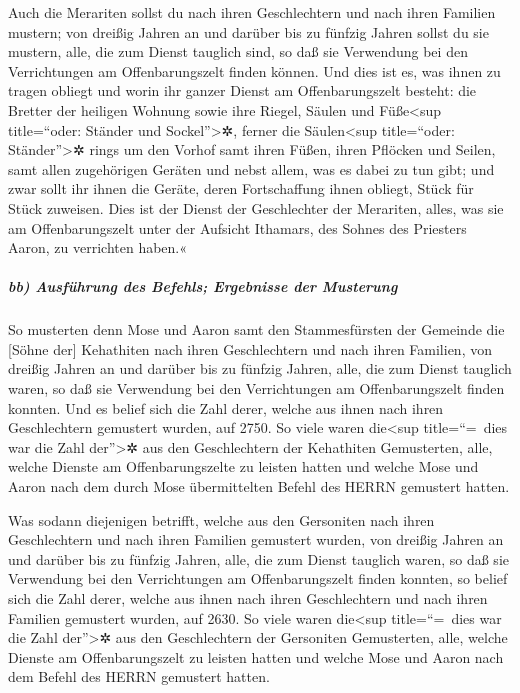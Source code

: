 Auch die Merariten sollst du nach ihren Geschlechtern und
nach ihren Familien mustern; von dreißig Jahren an und
darüber bis zu fünfzig Jahren sollst du sie mustern, alle, die zum
Dienst tauglich sind, so daß sie Verwendung bei den Verrichtungen am
Offenbarungszelt finden können. Und dies ist es, was
ihnen zu tragen obliegt und worin ihr ganzer Dienst am Offenbarungszelt
besteht: die Bretter der heiligen Wohnung sowie ihre Riegel, Säulen und
Füße\textless sup title=``oder: Ständer und Sockel''\textgreater✲,
ferner die Säulen\textless sup title=``oder:
Ständer''\textgreater✲ rings um den Vorhof samt ihren Füßen, ihren
Pflöcken und Seilen, samt allen zugehörigen Geräten und nebst allem, was
es dabei zu tun gibt; und zwar sollt ihr ihnen die Geräte, deren
Fortschaffung ihnen obliegt, Stück für Stück zuweisen.
Dies ist der Dienst der Geschlechter der Merariten,
alles, was sie am Offenbarungszelt unter der Aufsicht Ithamars, des
Sohnes des Priesters Aaron, zu verrichten haben.«

\hypertarget{bb-ausfuxfchrung-des-befehls-ergebnisse-der-musterung}{%
\subparagraph{bb) Ausführung des Befehls; Ergebnisse der
Musterung}\label{bb-ausfuxfchrung-des-befehls-ergebnisse-der-musterung}}

So musterten denn Mose und Aaron samt den Stammesfürsten
der Gemeinde die {[}Söhne der{]} Kehathiten nach ihren Geschlechtern und
nach ihren Familien, von dreißig Jahren an und darüber
bis zu fünfzig Jahren, alle, die zum Dienst tauglich waren, so daß sie
Verwendung bei den Verrichtungen am Offenbarungszelt finden konnten.
Und es belief sich die Zahl derer, welche aus ihnen nach
ihren Geschlechtern gemustert wurden, auf 2750. So viele
waren die\textless sup title=``=~dies war die Zahl der''\textgreater✲
aus den Geschlechtern der Kehathiten Gemusterten, alle, welche Dienste
am Offenbarungszelte zu leisten hatten und welche Mose und Aaron nach
dem durch Mose übermittelten Befehl des HERRN gemustert hatten.

Was sodann diejenigen betrifft, welche aus den Gersoniten
nach ihren Geschlechtern und nach ihren Familien gemustert wurden,
von dreißig Jahren an und darüber bis zu fünfzig Jahren,
alle, die zum Dienst tauglich waren, so daß sie Verwendung bei den
Verrichtungen am Offenbarungszelt finden konnten, so
belief sich die Zahl derer, welche aus ihnen nach ihren Geschlechtern
und nach ihren Familien gemustert wurden, auf 2630. So
viele waren die\textless sup title=``=~dies war die Zahl
der''\textgreater✲ aus den Geschlechtern der Gersoniten Gemusterten,
alle, welche Dienste am Offenbarungszelt zu leisten hatten und welche
Mose und Aaron nach dem Befehl des HERRN gemustert hatten.

